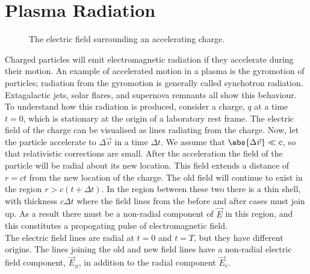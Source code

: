 \documentclass{book}         		                %
\begin{document}
\section{Plasma Radiation}
\label{sec:plasma-radiation}


\begin{figure}
  \centering
  
  \caption{The electric field surrounding an accelerating charge.}
  \label{fig:acceleratingcharge}
\end{figure}


Charged particles will emit electromagnetic radiation if they
accelerate during their motion. An example of accelerated motion in a
plasma is the gyromotion of particles; radiation from the gyromotion
is generally called synchotron radiation. Extagalactic jets, solar
flares, and supernova remnants all show this behaviour. \\To
understand how this radiation is produced, consider a charge, $q$ at a
time $t=0$, which is stationary at the origin of a laboratory rest
frame. The electric field of the charge can be visualised as lines
radiating from the charge. Now, let the particle accelerate to $\Delta
\vec{v}$ in a time $\Delta t$. We assume that $\abs{ \Delta \vec{v} }
\ll c$, so that relativistic corrections are small. After the
acceleration the field of the particle will be radial about its new
location. This field extends a distance of $r = ct$ from the new
location of the charge. The old field will continue to exist in the
region $r> c(t + \Delta t)$. In the region between these two there is
a thin shell, with thickness $c \Delta t$ where the field lines from
the before and after cases must join up. As a result there must be a
non-radial component of $\vec{E}$ in this region, and this constitutes
a propogating pulse of electromagnetic field. \\
The electric field lines are radial at $t=0$ and $t=T$, but they have
different origins. The lines joining the old and new field lines have
a non-radial electric field component, $\vec{E}_{\phi}$, in addition
to the radial component $\vec{E}_{r}$.
\end{document}
